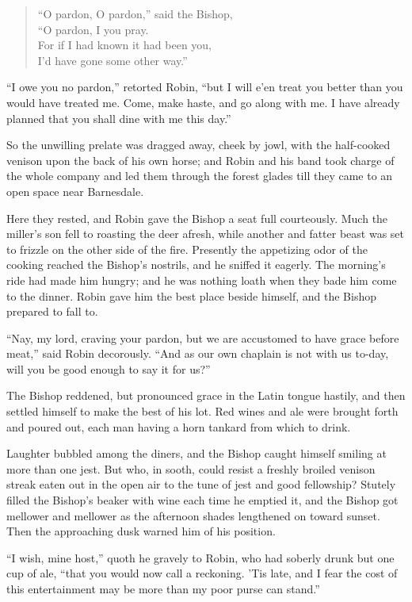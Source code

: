 \begin{quote}
``O pardon, O pardon,'' said the Bishop,\\
``O pardon, I you pray.\\
For if I had known it had been you,\\
I'd have gone some other way.''
\end{quote}

``I owe you no pardon,'' retorted Robin, ``but I will e'en treat you
better than you would have treated me. Come, make haste, and go along
with me. I have already planned that you shall dine with me this day.''

So the unwilling prelate was dragged away, cheek by jowl, with the
half-cooked venison upon the back of his own horse; and Robin and his
band took charge of the whole company and led them through the forest
glades till they came to an open space near Barnesdale.

Here they rested, and Robin gave the Bishop a seat full courteously.
Much the miller's son fell to roasting the deer afresh, while another
and fatter beast was set to frizzle on the other side of the fire.
Presently the appetizing odor of the cooking reached the Bishop's
nostrils, and he sniffed it eagerly. The morning's ride had made him
hungry; and he was nothing loath when they bade him come to the dinner.
Robin gave him the best place beside himself, and the Bishop prepared to
fall to.

``Nay, my lord, craving your pardon, but we are accustomed to have grace
before meat,'' said Robin decorously. ``And as our own chaplain is not
with us to-day, will you be good enough to say it for us?''

The Bishop reddened, but pronounced grace in the Latin tongue hastily,
and then settled himself to make the best of his lot. Red wines and ale
were brought forth and poured out, each man having a horn tankard from
which to drink.

Laughter bubbled among the diners, and the Bishop caught himself smiling
at more than one jest. But who, in sooth, could resist a freshly broiled
venison streak eaten out in the open air to the tune of jest and good
fellowship? Stutely filled the Bishop's beaker with wine each time he
emptied it, and the Bishop got mellower and mellower as the afternoon
shades lengthened on toward sunset. Then the approaching dusk warned him
of his position.

``I wish, mine host,'' quoth he gravely to Robin, who had soberly drunk
but one cup of ale, ``that you would now call a reckoning. 'Tis late,
and I fear the cost of this entertainment may be more than my poor purse
can stand.''

